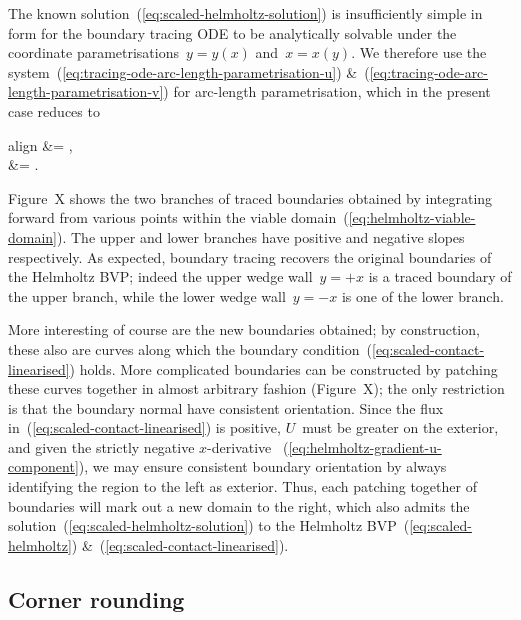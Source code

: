 The known solution~(\ref{eq:scaled-helmholtz-solution})
is insufficiently simple in form
for the boundary tracing ODE to be analytically solvable
under the coordinate parametrisations~$y = y (x)$ and~$x = x (y)$.
We therefore use the system~(\ref{eq:tracing-ode-arc-length-parametrisation-u})
\&~(\ref{eq:tracing-ode-arc-length-parametrisation-v})
for arc-length parametrisation,
which in the present case reduces to
\begin{important}{align}
   &= ,
    \label{eq:helmholtz-tracing-ode-arc-length-parametrisation-x}
    \\[\tallspace]
   &= .
    \label{eq:helmholtz-tracing-ode-arc-length-parametrisation-y}
\end{important}
Figure~X %
shows the two branches of traced boundaries obtained
by integrating forward from various points
within the viable domain~(\ref{eq:helmholtz-viable-domain}).
The upper and lower branches have positive and negative slopes respectively.
As expected,
boundary tracing recovers the original boundaries of the Helmholtz BVP\@;
indeed the upper wedge wall~$y = +x$ is a traced boundary of the upper branch,
while the lower wedge wall~$y = -x$ is one of the lower branch.

More interesting of course are the new boundaries obtained;
by construction, these also are curves
along which the boundary condition~(\ref{eq:scaled-contact-linearised}) holds.
More complicated boundaries can be constructed
by patching these curves together in almost arbitrary fashion
(Figure~X); %
the only restriction is that the boundary normal
have consistent orientation.
Since the flux in~(\ref{eq:scaled-contact-linearised}) is positive,
$U$~must be greater on the exterior,
and given the strictly negative $x$-derivative~%
  (\ref{eq:helmholtz-gradient-u-component}),
we may ensure consistent boundary orientation
by always identifying the region to the left as exterior.
Thus, each patching together of boundaries
will mark out a new domain to the right,
which also admits the solution~(\ref{eq:scaled-helmholtz-solution})
to the Helmholtz BVP~(\ref{eq:scaled-helmholtz})
\&~(\ref{eq:scaled-contact-linearised}).

\subsection{Corner rounding}
\label{sec:moderate.linearised.rounding}

